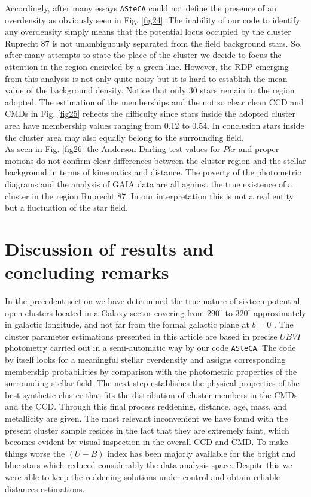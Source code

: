\documentclass{aa}
\begin{document}
Accordingly, after many essays \texttt{ASteCA} could not define the presence of
an overdensity as obviously seen in Fig. \ref{fig24}. The inability of our code
to identify any overdensity simply means that the potential locus occupied by
the cluster Ruprecht 87 is not unambiguously separated from the field background
stars. So, after many attempts to state the place of the cluster we decide to
focus the attention in the region encircled by a green line. However, the RDP
emerging from this analysis is not only quite noisy but it is hard to establish
the mean value of the background density. Notice that only 30 stars remain in
the region adopted. The estimation of the memberships and the not so clear clean
CCD and CMDs in Fig. \ref{fig25} reflects the difficulty since stars inside the
adopted cluster area have membership values ranging from 0.12 to 0.54. In
conclusion stars inside the cluster area may also equally belong to the
surrounding field.\\

As seen in Fig. \ref{fig26} the Anderson-Darling test values for $Plx$ and
proper motions do not confirm clear differences between the cluster region and
the stellar background in terms of kinematics and distance. The poverty of the
photometric diagrams and the analysis of GAIA data are all against the true
existence of a cluster in the region Ruprecht 87. In our interpretation this is
not a real entity but a fluctuation of the star field.





\section{Discussion of results and concluding remarks}
\label{sec:results_concl}

In the precedent section we have determined the true nature of sixteen potential
open clusters located in a Galaxy sector covering from $290^\circ$ to
$320^\circ$ approximately in galactic longitude, and not far from the formal
galactic plane at $b = 0^\circ$.
The cluster parameter estimations presented in this article
are based in precise $UBVI$ photometry carried out in a semi-automatic way by
our code \texttt{ASteCA}. The code by itself looks for a meaningful stellar
overdensity and assigns corresponding membership probabilities by comparison
with the photometric properties of the surrounding stellar field.
The next step establishes the physical properties of the best synthetic cluster
that fits the distribution of cluster members in the CMDs and the CCD.
Through this final process reddening, distance, age, mass, and metallicity are
given.
The most relevant inconvenient we have found with the present cluster
sample resides in the fact that they are extremely faint, which becomes evident
by visual inspection in the overall CCD and CMD.
To make things worse the $(U-B)$ index has been majorly available for
the bright and blue stars which reduced considerably the data analysis space.
Despite this we were able to keep the reddening solutions under control and
obtain reliable distances estimations.
\end{document}
